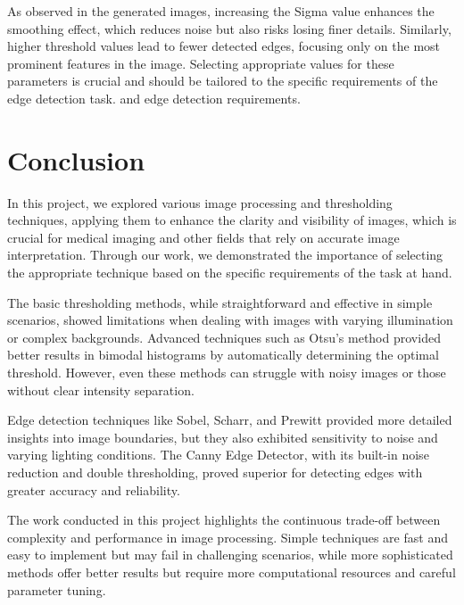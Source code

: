 \documentclass[%
	a4paper, %
	12pt, %
	english, %
	bibtotoc %
]{scrartcl}
\begin{document}
As observed in the generated images, increasing the Sigma value enhances the smoothing effect, which reduces noise but also risks losing finer details. Similarly, higher threshold values lead to fewer detected edges, focusing only on the most prominent features in the image. Selecting appropriate values for these parameters is crucial and should be tailored to the specific requirements of the edge detection task.
and edge detection requirements.



\newpage
\section{Conclusion}

In this project, we explored various image processing and thresholding techniques, applying them to enhance the clarity and visibility of images, which is crucial for medical imaging and other fields that rely on accurate image interpretation. Through our work, we demonstrated the importance of selecting the appropriate technique based on the specific requirements of the task at hand.

The basic thresholding methods, while straightforward and effective in simple scenarios, showed limitations when dealing with images with varying illumination or complex backgrounds. Advanced techniques such as Otsu's method provided better results in bimodal histograms by automatically determining the optimal threshold. However, even these methods can struggle with noisy images or those without clear intensity separation.

Edge detection techniques like Sobel, Scharr, and Prewitt provided more detailed insights into image boundaries, but they also exhibited sensitivity to noise and varying lighting conditions. The Canny Edge Detector, with its built-in noise reduction and double thresholding, proved superior for detecting edges with greater accuracy and reliability.

The work conducted in this project highlights the continuous trade-off between complexity and performance in image processing. Simple techniques are fast and easy to implement but may fail in challenging scenarios, while more sophisticated methods offer better results but require more computational resources and careful parameter tuning.
\end{document}
